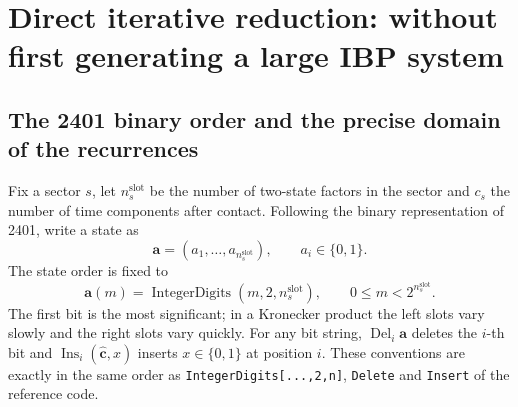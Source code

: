 \documentclass[11pt,a4paper]{article}
\begin{document}
\section{Direct iterative reduction: without first generating a large IBP system}

\subsection{The 2401 binary order and the precise domain of the recurrences}

Fix a sector $s$, let $n_s^{\mathrm{slot}}$ be the number of two-state factors in the sector and $c_s$ the number of time components after contact. Following the binary representation of 2401, write a state as
\begin{equation}
 \bm a=(a_1,\ldots,a_{n_s^{\mathrm{slot}}}),
 \qquad a_i\in\{0,1\}.
\end{equation}
The state order is fixed to
\begin{equation}
 \bm a(m)=\operatorname{IntegerDigits}(m,2,n_s^{\mathrm{slot}}),
 \qquad 0\leq m<2^{n_s^{\mathrm{slot}}}.
 \label{eq:binary-state-order}
\end{equation}
The first bit is the most significant; in a Kronecker product the left slots vary slowly and the right slots vary quickly. For any bit string, $\operatorname{Del}_i\bm a$ deletes the $i$-th bit and $\operatorname{Ins}_i(\widehat{\bm c},x)$ inserts $x\in\{0,1\}$ at position $i$. These conventions are exactly in the same order as \texttt{IntegerDigits[...,2,n]}, \texttt{Delete} and \texttt{Insert} of the reference code.
\end{document}
